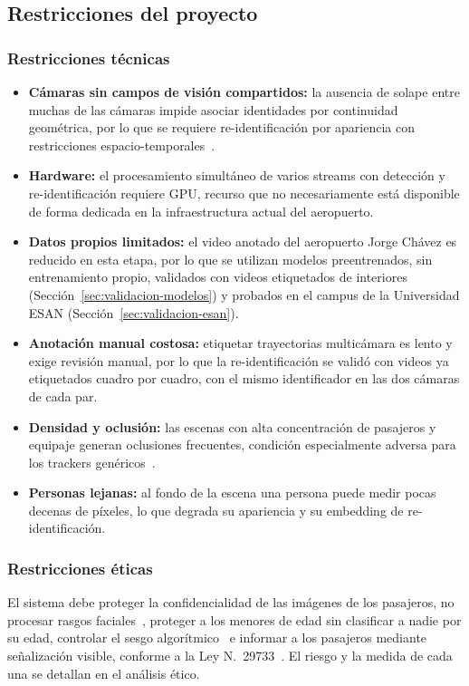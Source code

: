 \documentclass[12pt,a4paper]{article}
\begin{document}
\subsection{Restricciones del proyecto}

\subsubsection{Restricciones técnicas}
\begin{itemize}
    \item \textbf{Cámaras sin campos de visión compartidos:} la ausencia
    de solape entre muchas de las cámaras impide asociar identidades por
    continuidad geométrica, por lo que se requiere re-identificación por
    apariencia con restricciones espacio-temporales~\cite{yang2023}.
    \item \textbf{Hardware:} el procesamiento simultáneo de varios
    streams con detección y re-identificación requiere GPU, recurso que
    no necesariamente está disponible de forma dedicada en la
    infraestructura actual del aeropuerto.
    \item \textbf{Datos propios limitados:} el video anotado del
    aeropuerto Jorge Chávez es reducido en esta etapa, por lo que se
    utilizan modelos preentrenados, sin entrenamiento propio, validados con
    videos etiquetados de interiores (Sección~\ref{sec:validacion-modelos})
    y probados en el campus de la Universidad ESAN
    (Sección~\ref{sec:validacion-esan}).
    \item \textbf{Anotación manual costosa:} etiquetar trayectorias
    multicámara es lento y exige revisión manual, por lo que la
    re-identificación se validó con videos ya etiquetados cuadro por cuadro,
    con el mismo identificador en las dos cámaras de cada par.
    \item \textbf{Densidad y oclusión:} las escenas con alta concentración
    de pasajeros y equipaje generan oclusiones frecuentes, condición
    especialmente adversa para los trackers genéricos~\cite{zhou2026}.
    \item \textbf{Personas lejanas:} al fondo de la escena una persona
    puede medir pocas decenas de píxeles, lo que degrada su apariencia y
    su embedding de re-identificación.
\end{itemize}

\subsubsection{Restricciones éticas}
El sistema debe proteger la confidencialidad de las imágenes de los
pasajeros, no procesar rasgos faciales~\cite{mendes2023,ryan2023}, proteger a
los menores de edad sin clasificar a nadie por su edad, controlar el sesgo
algorítmico~\cite{jin2024} e informar a los pasajeros mediante señalización
visible, conforme a la Ley N.\textdegree~29733~\cite{ley29733}. El riesgo y la medida de cada
una se detallan en el análisis ético.
\end{document}
